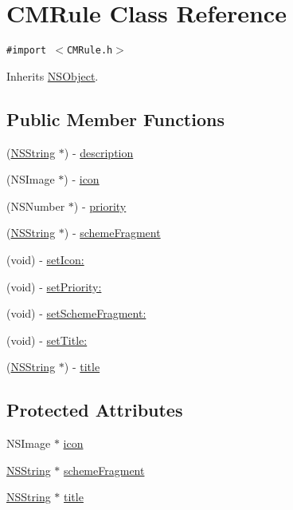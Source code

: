 \hypertarget{interface_c_m_rule}{
\section{CMRule Class Reference}
\label{interface_c_m_rule}
}
{\tt \#import $<$CMRule.h$>$}

Inherits \hyperlink{class_n_s_object}{NSObject}.

\subsection*{Public Member Functions}
\begin{CompactItemize}
\item 
(\hyperlink{class_n_s_string}{NSString} $\ast$) - \hyperlink{interface_c_m_rule_51963c06e66c9a9d7ca93720b4aa71c6}{description}
\item 
(NSImage $\ast$) - \hyperlink{interface_c_m_rule_5ab693404be3d6c9c23d32bf4aeba7b9}{icon}
\item 
(NSNumber $\ast$) - \hyperlink{interface_c_m_rule_aa7715326f511deb561ac41501a194f9}{priority}
\item 
(\hyperlink{class_n_s_string}{NSString} $\ast$) - \hyperlink{interface_c_m_rule_02379e3a0f736406489213d7383c30ef}{schemeFragment}
\item 
(void) - \hyperlink{interface_c_m_rule_ad8e35c1a1a8d51196b404ac777ba605}{setIcon:}
\item 
(void) - \hyperlink{interface_c_m_rule_2b25aeb05541e065609bb4f9b2753563}{setPriority:}
\item 
(void) - \hyperlink{interface_c_m_rule_423429401c268d2591fd138ca03bf494}{setSchemeFragment:}
\item 
(void) - \hyperlink{interface_c_m_rule_72255be9d9d50884e692835f461d906e}{setTitle:}
\item 
(\hyperlink{class_n_s_string}{NSString} $\ast$) - \hyperlink{interface_c_m_rule_f628df2a3f47e8a1e61edfcc99e7d01f}{title}
\end{CompactItemize}
\subsection*{Protected Attributes}
\begin{CompactItemize}
\item 
NSImage $\ast$ \hyperlink{interface_c_m_rule_ba7185a99d1799e91609c1e83d9201a0}{icon}
\item 
\hyperlink{class_n_s_string}{NSString} $\ast$ \hyperlink{interface_c_m_rule_483ee55143e0ed678e8b64f4d11c719e}{schemeFragment}
\item 
\hyperlink{class_n_s_string}{NSString} $\ast$ \hyperlink{interface_c_m_rule_5fd61a026220fa129d974771be6b4b4d}{title}
\end{CompactItemize}


